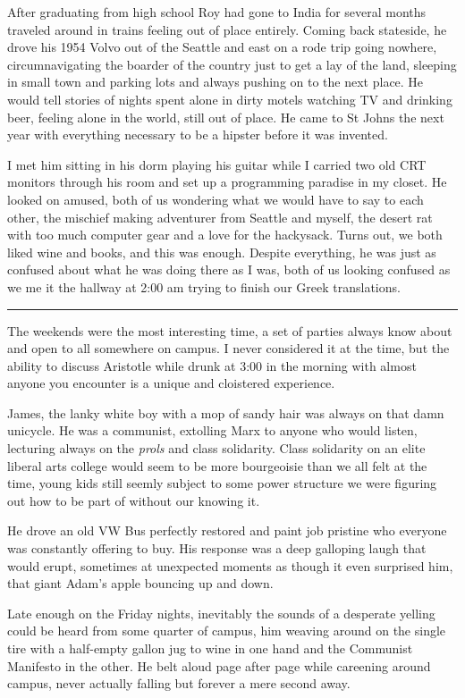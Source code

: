 \documentclass[ebook, 10pt, openright, onecolumn]{memoir}
\newcommand*\td[1]{
  \todo[inline]{
     #1 
  }
}
\newcommand*\starbreak{\fancybreak*{\Large{* * *}}}
\newcommand*\finish{\td{ ----- Finish this section -----}}
\begin{document}
After graduating from high school Roy had gone to India for several months
traveled around in trains feeling out of place entirely.  Coming back stateside,
he drove his 1954 Volvo out of the Seattle and east on a rode trip going
nowhere, circumnavigating the boarder of the country just to get a lay of the
land, sleeping in small town and parking lots and always pushing on to the next
place.  He would tell stories of nights spent alone in dirty motels watching TV
and drinking beer, feeling alone in the world, still out of place.  He came to
St Johns the next year with everything necessary to be a hipster before it was
invented.

I met him sitting in his dorm playing his guitar while I carried two
old CRT monitors through his room and set up a programming paradise in my
closet.  He looked on amused, both of us wondering what we would have to say to
each other, the mischief making adventurer from Seattle and myself, the desert
rat with too much computer gear and a love for the hackysack.  Turns out, we
both liked wine and books, and this was enough.  Despite everything, he was just
as confused about what he was doing there as I was, both of us looking confused
as we me it the hallway at 2:00 am trying to finish our Greek translations.

\finish
\starbreak

The weekends were the most interesting time, a set of parties always know about
and open to all somewhere on campus.  I never considered it at the time, but the
ability to discuss Aristotle while drunk at 3:00 in the morning with almost
anyone you encounter is a unique and cloistered experience.  

James, the lanky white boy with a mop of sandy hair was always on that damn
unicycle.  He was a communist, extolling Marx to anyone who would listen,
lecturing always on the \textit{prols} and class solidarity.  Class solidarity
on an elite liberal arts college would seem to be more bourgeoisie than we all
felt at the time, young kids still seemly subject to some power structure we
were figuring out how to be part of without our knowing it.  

He drove an old VW Bus perfectly restored and paint job pristine who everyone
was constantly offering to buy.  His response was a deep galloping laugh that
would erupt, sometimes at unexpected moments as though it even surprised him,
that giant Adam's apple bouncing up and down.  

Late enough on the Friday nights, inevitably the sounds of a desperate yelling
could be heard from some quarter of campus, him weaving around on the single
tire with a half-empty gallon jug to wine in one hand and the Communist
Manifesto in the other.  He belt aloud page after page while careening around
campus, never actually falling but forever a mere second away.
\end{document}
